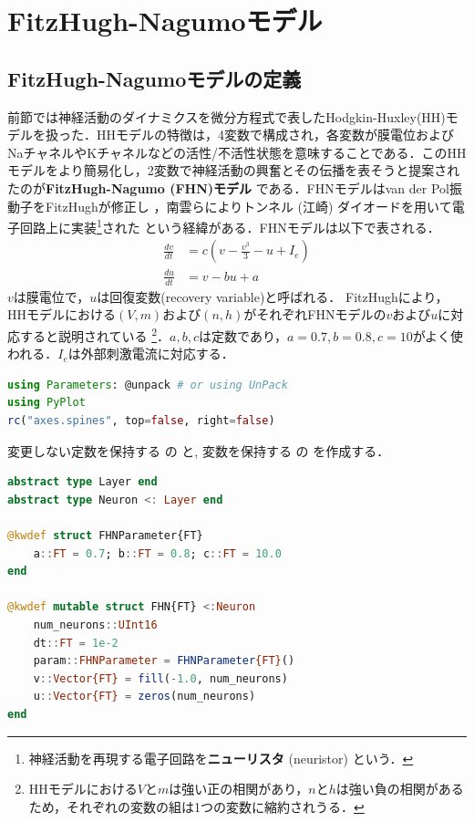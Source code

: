 \section{FitzHugh-Nagumoモデル}
\subsection{FitzHugh-Nagumoモデルの定義}
前節では神経活動のダイナミクスを微分方程式で表したHodgkin-Huxley(HH)モデルを扱った．HHモデルの特徴は，4変数で構成され，各変数が膜電位およびNaチャネルやKチャネルなどの活性/不活性状態を意味することである．このHHモデルをより簡易化し，2変数で神経活動の興奮とその伝播を表そうと提案されたのが\textbf{FitzHugh-Nagumo (FHN)モデル} である．FHNモデルはvan der Pol振動子をFitzHughが修正し\citep{FitzHugh1955-bx} \citep{Fitzhugh1961-fp}，南雲らによりトンネル (江崎) ダイオードを用いて電子回路上に実装\footnote{神経活動を再現する電子回路を\textbf{ニューリスタ}  (neuristor) という．}された \citep{Nagumo1962-ob}という経緯がある．FHNモデルは以下で表される．
\begin{align} 
\frac{dv}{dt} &= c\left(v-\frac{v^3}{3}-u+I_e\right)\\ 
\frac{du}{dt} &= v-bu+a 
\end{align}
$v$は膜電位で，$u$は回復変数(recovery variable)と呼ばれる． FitzHughにより，HHモデルにおける$(V, m)$および$(n, h)$がそれぞれFHNモデルの$v$および$u$に対応すると説明されている \citep{Fitzhugh1961-fp} \footnote{HHモデルにおける$V$と$m$は強い正の相関があり，$n$と$h$は強い負の相関があるため，それぞれの変数の組は1つの変数に縮約されうる．}．$a,b,c$は定数であり，$a=0.7, b=0.8, c=10$がよく使われる．$I_e$は外部刺激電流に対応する．
\begin{lstlisting}[language=julia]
using Parameters: @unpack # or using UnPack
using PyPlot
rc("axes.spines", top=false, right=false)
\end{lstlisting}
変更しない定数を保持する  の  と, 変数を保持する  の  を作成する．
\begin{lstlisting}[language=julia]
abstract type Layer end
abstract type Neuron <: Layer end

@kwdef struct FHNParameter{FT}
    a::FT = 0.7; b::FT = 0.8; c::FT = 10.0
end

@kwdef mutable struct FHN{FT} <:Neuron
    num_neurons::UInt16
    dt::FT = 1e-2
    param::FHNParameter = FHNParameter{FT}()
    v::Vector{FT} = fill(-1.0, num_neurons) 
    u::Vector{FT} = zeros(num_neurons)
end
\end{lstlisting}
